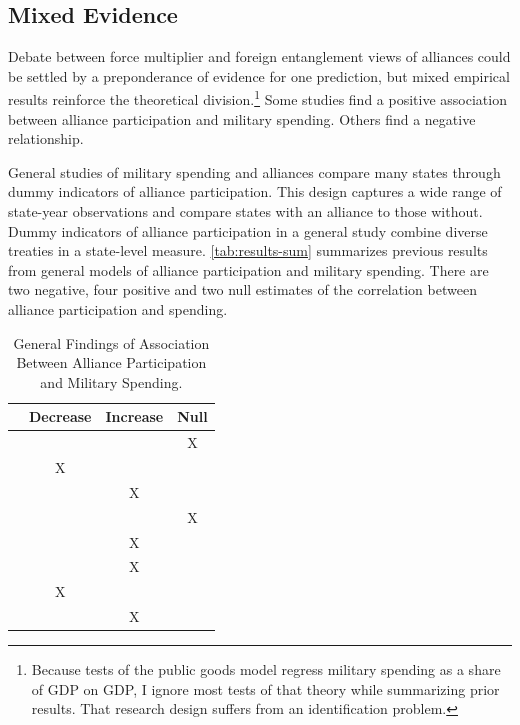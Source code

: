 \documentclass[12pt]{article}
\begin{document}
\subsection{Mixed Evidence} 


Debate between force multiplier and foreign entanglement views of alliances could be settled by a preponderance of evidence for one prediction, but mixed empirical results reinforce the theoretical division.\footnote{
Because tests of the public goods model regress military spending as a share of GDP on GDP, I ignore most tests of that theory while summarizing prior results. That research design suffers from an identification problem.}
Some studies find a positive association between alliance participation and military spending. 
Others find a negative relationship. 


General studies of military spending and alliances compare many states through dummy indicators of alliance participation. 
This design captures a wide range of state-year observations and compare states with an alliance to those without.
Dummy indicators of alliance participation in a general study combine diverse treaties in a state-level measure. 
\autoref{tab:results-sum} summarizes previous results from general models of alliance participation and military spending. 
There are two negative, four positive and two null estimates of the correlation between alliance participation and spending. 


\begin{table}[hbt!]
\begin{center}
\begin{tabular}{lccc}
     & Decrease & Increase & Null \\
\hline
\citet{MostSiverson1987} &  &  & X \\
\citet{Conybeare1994} & X & &  \\
\citet{Diehl1994} &  & X &  \\
\citet{Goldsmith2003} &  &  & X \\
\citet{MorganPalmer2006} &  & X & \\ 
\citet{QuirozFlores2011} &  & X &  \\ 
\citet{DigiuseppePoast2016} & X &  & \\ 
\citet{Horowitzetal2017} &  & X & \\ 
\hline
\end{tabular}
\caption{General Findings of Association Between Alliance Participation and Military Spending.}
\label{tab:results-sum}
\end{center} 
\end{table}
\end{document}
